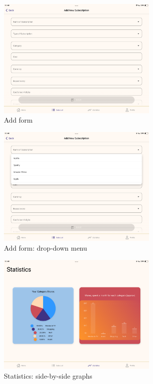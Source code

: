 \documentclass[12pt]{article}
\begin{document}
\begin{figure}[h!]
    \begin{center}
        \includegraphics[width=0.7\textwidth, clip]{../../assets/tablet/add.PNG}
    \end{center}
    \caption{Add form}
    \label{fig:tadd}
\end{figure}

\begin{figure}[h!]
    \begin{center}
        \includegraphics[width=0.7\textwidth, clip]{../../assets/tablet/addDrop.PNG}
    \end{center}
    \caption{Add form: drop-down menu}
    \label{fig:taddDrop}
\end{figure}

\begin{figure}[h!]
    \begin{center}
        \includegraphics[width=0.7\textwidth, clip]{../../assets/tablet/stats.PNG}
    \end{center}
    \caption{Statistics: side-by-side graphs}
    \label{fig:tstats}
\end{figure}
\end{document}
